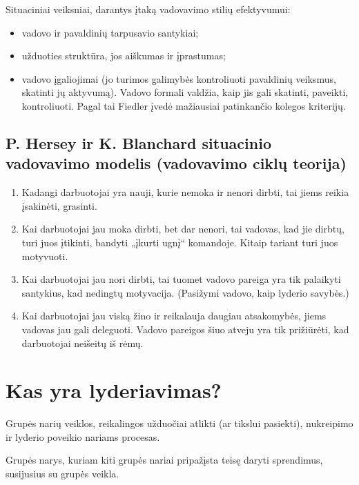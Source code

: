 Situaciniai veiksniai, darantys įtaką vadovavimo stilių efektyvumui:
\begin{itemize}
  \item vadovo ir pavaldinių tarpusavio santykiai;
  \item užduoties struktūra, jos aiškumas ir įprastumas;
  \item vadovo įgaliojimai (jo turimos galimybės kontroliuoti pavaldinių
    veiksmus, skatinti jų aktyvumą). Vadovo formali valdžia, kaip jis
    gali skatinti, paveikti, kontroliuoti. Pagal tai Fiedler įvedė
    mažiausiai patinkančio kolegos kriterijų.
\end{itemize}

\subsection{P. Hersey ir K. Blanchard situacinio vadovavimo modelis
(vadovavimo ciklų teorija)}

\begin{enumerate}
  \item Kadangi darbuotojai yra nauji, kurie nemoka ir nenori dirbti,
    tai jiems reikia įsakinėti, grasinti.
  \item Kai darbuotojai jau moka dirbti, bet dar nenori, tai vadovas,
    kad jie dirbtų, turi juos įtikinti, bandyti „įkurti ugnį“ komandoje.
    Kitaip tariant turi juos motyvuoti.
  \item Kai darbuotojai jau nori dirbti, tai tuomet vadovo pareiga yra tik
    palaikyti santykius, kad nedingtų motyvacija. (Pasižymi vadovo, kaip
    lyderio savybės.)
  \item Kai darbuotojai jau viską žino ir reikalauja daugiau atsakomybės,
    jiems vadovas jau gali deleguoti. Vadovo pareigos šiuo atveju yra tik
    prižiūrėti, kad darbuotojai neišeitų iš rėmų.
\end{enumerate}

\section{Kas yra lyderiavimas?}

\begin{defn}[Lyderiavimas]
  Grupės narių veiklos, reikalingos užduočiai atlikti (ar tikslui pasiekti),
  nukreipimo ir lyderio poveikio nariams procesas.
\end{defn}

\begin{defn}[Lyderis]
  Grupės narys, kuriam kiti grupės nariai pripažįsta teisę daryti
  sprendimus, susijusius su grupės veikla.
\end{defn}

